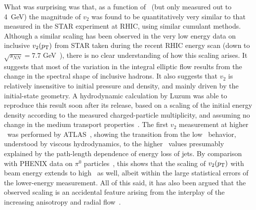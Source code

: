 What was surprising was that, as a function of \pT\ (but only measured out to 4~GeV)
the magnitude of $v_2$ was found to be quantitatively very similar to that measured in
the STAR experiment at RHIC, using similar cumulant methods.
Although a similar scaling has been observed in the very low energy
data on inclusive $v_2(\mbox{$p_{\mathrm{T}}$})$ from STAR taken during the recent RHIC energy scan (down
to $\sqrt{s_{NN}}=7.7$ GeV~\cite{Adamczyk:2012ku}),
there is no clear understanding of how this scaling arises.
It suggests that most of the variation in the integral elliptic flow results from the change in the spectral shape of inclusive hadrons.
It also suggests that $v_2$ is relatively insensitive to initial pressure and density, and
mainly driven by the initial-state geometry.
A hydrodynamic calculation by Luzum was able to reproduce this result soon after its release,
based on a scaling of the initial energy density according to the measured charged-particle
multiplicity, and assuming no change in the medium transport properties~\cite{Luzum:2010ag}.
The first $v_2$ measurement at higher \pT\ was performed by ATLAS~\cite{ATLAS:2011ah},
showing the transition from the low \pT\ behavior,
understood by viscous hydrodynamics, to the higher \pT\ values presumably explained by the path-length dependence of
energy loss of jets.
By comparison with PHENIX data on $\pi^0$ particles~\cite{Adare:2010sp}, this shows that the scaling of $\mbox{$v_2$}(\mbox{$p_{\mathrm{T}}$})$ with beam energy
extends to high \pT\ as well,
albeit within the large statistical errors of the lower-energy measurement.
All of this said, it has also been argued that the observed scaling
is an accidental feature arising from the
interplay of the increasing anisotropy and radial flow~\cite{Shen:2012vn}.

